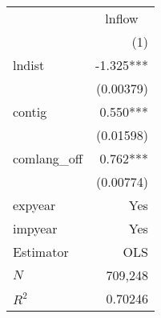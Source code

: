 \begin{tabular}{lr}
\toprule
            & \multicolumn{1}{c}{lnflow} \\ 
\cmidrule(lr){2-2} 
            &                        (1) \\ 
\midrule
lndist      &                  -1.325*** \\ 
            &                  (0.00379) \\ 
contig      &                   0.550*** \\ 
            &                  (0.01598) \\ 
comlang_off &                   0.762*** \\ 
            &                  (0.00774) \\ 
\midrule
expyear     &                        Yes \\ 
impyear     &                        Yes \\ 
\midrule
Estimator   &                        OLS \\ 
\midrule
$N$         &                    709,248 \\ 
$R^2$       &                    0.70246 \\ 
\bottomrule
\end{tabular}
